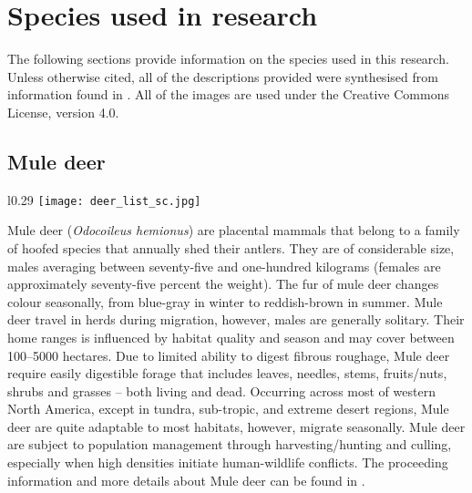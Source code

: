 \chapter{Species used in research}\label{apx:B}
\newpage

The following sections provide information on the species used in this research. Unless otherwise cited, all of the descriptions provided were synthesised from information found in \cite{vand08}. All of the images are used under the Creative Commons License, version 4.0.

\section{Mule deer}\label{deer}
\vspace{-0.3cm}
\setlength\intextsep{0pt}
\begin{wrapfigure}{l}{0.29\textwidth}
\centering
\texttt{[image: deer\_list\_sc.jpg]}
\end{wrapfigure}
Mule deer (\textit{Odocoileus hemionus}) are placental mammals that belong to a family of hoofed species that annually shed their antlers. They are of considerable size, males averaging between seventy-five and one-hundred kilograms (females are approximately seventy-five percent the weight). The fur of mule deer changes colour seasonally, from blue-gray in winter to reddish-brown in summer. Mule deer travel in herds during migration, however, males are generally solitary. Their home ranges is influenced by habitat quality and season and may cover between 100--5000 hectares. Due to limited ability to digest fibrous roughage, Mule deer require easily digestible forage that includes leaves, needles, stems, fruits/nuts, shrubs and grasses -- both living and dead. Occurring across most of western North America, except in tundra, sub-tropic, and extreme desert regions, Mule deer are quite adaptable to most habitats, however, migrate seasonally. Mule deer are subject to population management through harvesting/hunting and culling, especially when high densities initiate human-wildlife conflicts. The proceeding information and more details about Mule deer can be found in \cite{ferg05}.

